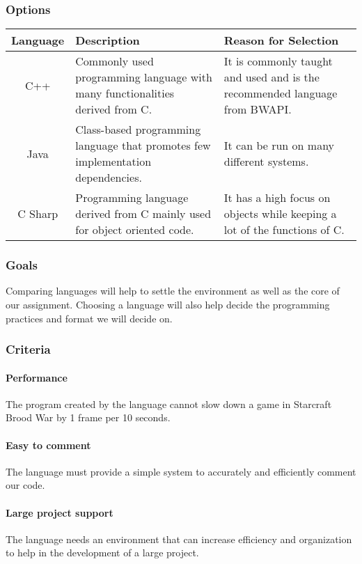 \documentclass[10pt,letterpaper,onecolumn,draftclsnofoot]{IEEEtran}
\begin{document}
\subsubsection{Options}
\begin{center}
\begin{tabular}{ ||C|L|L|| } 
\hline
Language & Description & Reason for Selection \\
 \hline
 C++ & Commonly used programming language with many functionalities derived from C. & It is commonly taught and used and is the recommended language from BWAPI. \\ 
 \hline
 Java & Class-based programming language that promotes few implementation dependencies. & It can be run on many different systems.\\ 
 \hline
 C Sharp & Programming language derived from C mainly used for object oriented code. & It has a high focus on objects while keeping a lot of the functions of C. \\ 
 \hline
\end{tabular}
\end{center}

\subsubsection{Goals}
Comparing languages will help to settle the environment as well as the core of our assignment. Choosing a language will also help decide the programming practices and format we will decide on.

\subsubsection{Criteria}
\paragraph{Performance}
The program created by the language cannot slow down a game in Starcraft Brood War by 1 frame per 10 seconds.

\paragraph{Easy to comment}
The language must provide a simple system to accurately and efficiently comment our code.

\paragraph{Large project support}
The language needs an environment that can increase efficiency and organization to help in the development of a large project.
\end{document}
